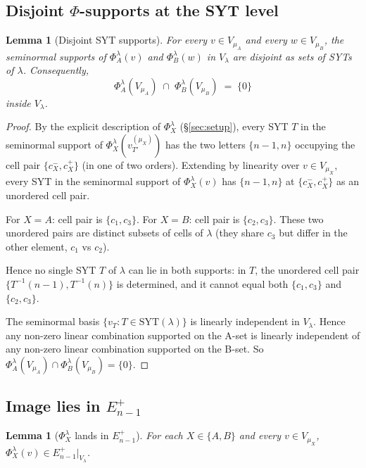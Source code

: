 \documentclass[11pt]{article}
\newtheorem{lemma}[theorem]{Lemma}
\theoremstyle{definition}
\begin{document}
\subsection{Disjoint $\Phi$-supports at the SYT level}

\begin{lemma}[Disjoint SYT supports]\label{lem:disjoint-supp}
For every $v \in V_{\mu_A}$ and every $w \in V_{\mu_B}$, the
seminormal supports of $\Phi_A^\lambda(v)$ and $\Phi_B^\lambda(w)$ in
$V_\lambda$ are disjoint as sets of SYTs of $\lambda$.
Consequently,
\[
   \Phi_A^\lambda(V_{\mu_A}) \;\cap\; \Phi_B^\lambda(V_{\mu_B})
   \;=\; \{0\}
\]
inside $V_\lambda$.
\end{lemma}

\begin{proof}
By the explicit description of $\Phi_X^\lambda$
(\S\ref{sec:setup}), every SYT $T$ in the seminormal support of
$\Phi_X^\lambda(v_{T'}^{(\mu_X)})$ has the two letters $\{n-1, n\}$
occupying the cell pair $\{c_X^-, c_X^+\}$ (in one of two orders).
Extending by linearity over $v \in V_{\mu_X}$, every SYT in the
seminormal support of $\Phi_X^\lambda(v)$ has $\{n-1, n\}$ at
$\{c_X^-, c_X^+\}$ as an unordered cell pair.

For $X = A$: cell pair is $\{c_1, c_3\}$.
For $X = B$: cell pair is $\{c_2, c_3\}$.
These two unordered pairs are distinct subsets of cells of $\lambda$
(they share $c_3$ but differ in the other element, $c_1$ vs $c_2$).

Hence no single SYT $T$ of $\lambda$ can lie in both supports: in $T$,
the unordered cell pair $\{T^{-1}(n-1), T^{-1}(n)\}$ is determined,
and it cannot equal both $\{c_1, c_3\}$ and $\{c_2, c_3\}$.

The seminormal basis $\{v_T : T \in \mathrm{SYT}(\lambda)\}$ is
linearly independent in $V_\lambda$. Hence any non-zero linear
combination supported on the A-set is linearly independent of any
non-zero linear combination supported on the B-set. So
$\Phi_A^\lambda(V_{\mu_A}) \cap \Phi_B^\lambda(V_{\mu_B}) = \{0\}$.
\end{proof}

\subsection{Image lies in $E_{n-1}^+$}

\begin{lemma}[$\Phi_X^\lambda$ lands in $E_{n-1}^+$]\label{lem:image-in-Eplus}
For each $X \in \{A, B\}$ and every $v \in V_{\mu_X}$,
$\Phi_X^\lambda(v) \in E_{n-1}^+|_{V_\lambda}$.
\end{lemma}
\end{document}
